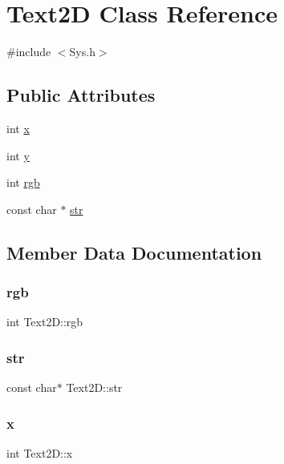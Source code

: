 \hypertarget{classText2D}{}\section{Text2D Class Reference}
\label{classText2D}


{\ttfamily \#include $<$Sys.\+h$>$}

\subsection*{Public Attributes}
\begin{DoxyCompactItemize}
\item 
int \mbox{\hyperlink{classText2D_ab5e2483e297285ca40e3af6e0b041213}{x}}
\item 
int \mbox{\hyperlink{classText2D_a2b4150bdd93e15abdeb5caba4511c7f2}{y}}
\item 
int \mbox{\hyperlink{classText2D_a2335188393ddb98755952c8ddb01cbda}{rgb}}
\item 
const char $\ast$ \mbox{\hyperlink{classText2D_a56e3dff0e913607fca10d5c22aa3888c}{str}}
\end{DoxyCompactItemize}


\subsection{Member Data Documentation}
\mbox{\label{classText2D_a2335188393ddb98755952c8ddb01cbda}} 
\subsubsection{\texorpdfstring{rgb}{rgb}}
{\footnotesize\ttfamily int Text2\+D\+::rgb}

\mbox{\label{classText2D_a56e3dff0e913607fca10d5c22aa3888c}} 
\subsubsection{\texorpdfstring{str}{str}}
{\footnotesize\ttfamily const char$\ast$ Text2\+D\+::str}

\mbox{\label{classText2D_ab5e2483e297285ca40e3af6e0b041213}} 
\subsubsection{\texorpdfstring{x}{x}}
{\footnotesize\ttfamily int Text2\+D\+::x}


